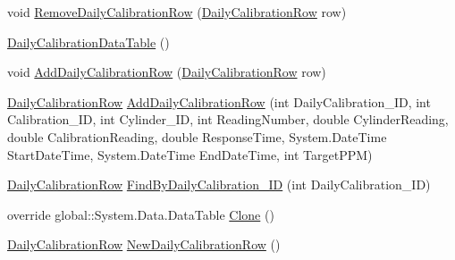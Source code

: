 \begin{DoxyCompactItemize}
\item 
void \hyperlink{class_env_int_1_1_win32_1_1_field_tech_1_1_manager_1_1_data_sets_1_1_guide_ware_mobile_data_set_5b380d875f3f569d74f6183f0c2ee8d7_a74c82b018660dfd8dadd40030c667b17}{Remove\+Daily\+Calibration\+Row} (\hyperlink{class_env_int_1_1_win32_1_1_field_tech_1_1_manager_1_1_data_sets_1_1_guide_ware_mobile_data_set_1_1_daily_calibration_row}{Daily\+Calibration\+Row} row)
\item 
\hyperlink{class_env_int_1_1_win32_1_1_field_tech_1_1_manager_1_1_data_sets_1_1_guide_ware_mobile_data_set_5b380d875f3f569d74f6183f0c2ee8d7_a2e52557c0b4cd80b98ebc66507475e6f}{Daily\+Calibration\+Data\+Table} ()
\item 
void \hyperlink{class_env_int_1_1_win32_1_1_field_tech_1_1_manager_1_1_data_sets_1_1_guide_ware_mobile_data_set_5b380d875f3f569d74f6183f0c2ee8d7_aadd6bbe6b0b0c30271faca3565c512c9}{Add\+Daily\+Calibration\+Row} (\hyperlink{class_env_int_1_1_win32_1_1_field_tech_1_1_manager_1_1_data_sets_1_1_guide_ware_mobile_data_set_1_1_daily_calibration_row}{Daily\+Calibration\+Row} row)
\item 
\hyperlink{class_env_int_1_1_win32_1_1_field_tech_1_1_manager_1_1_data_sets_1_1_guide_ware_mobile_data_set_1_1_daily_calibration_row}{Daily\+Calibration\+Row} \hyperlink{class_env_int_1_1_win32_1_1_field_tech_1_1_manager_1_1_data_sets_1_1_guide_ware_mobile_data_set_5b380d875f3f569d74f6183f0c2ee8d7_af32b7c7c15fc39cb0981c667a6bac890}{Add\+Daily\+Calibration\+Row} (int Daily\+Calibration\+\_\+\+I\+D, int Calibration\+\_\+\+I\+D, int Cylinder\+\_\+\+I\+D, int Reading\+Number, double Cylinder\+Reading, double Calibration\+Reading, double Response\+Time, System.\+Date\+Time Start\+Date\+Time, System.\+Date\+Time End\+Date\+Time, int Target\+P\+P\+M)
\item 
\hyperlink{class_env_int_1_1_win32_1_1_field_tech_1_1_manager_1_1_data_sets_1_1_guide_ware_mobile_data_set_1_1_daily_calibration_row}{Daily\+Calibration\+Row} \hyperlink{class_env_int_1_1_win32_1_1_field_tech_1_1_manager_1_1_data_sets_1_1_guide_ware_mobile_data_set_5b380d875f3f569d74f6183f0c2ee8d7_a143370f7c7b251739582a1d8cadec24a}{Find\+By\+Daily\+Calibration\+\_\+\+I\+D} (int Daily\+Calibration\+\_\+\+I\+D)
\item 
override global\+::\+System.\+Data.\+Data\+Table \hyperlink{class_env_int_1_1_win32_1_1_field_tech_1_1_manager_1_1_data_sets_1_1_guide_ware_mobile_data_set_5b380d875f3f569d74f6183f0c2ee8d7_a5ab09785530b36a0bc9f5235dfb12360}{Clone} ()
\item 
\hyperlink{class_env_int_1_1_win32_1_1_field_tech_1_1_manager_1_1_data_sets_1_1_guide_ware_mobile_data_set_1_1_daily_calibration_row}{Daily\+Calibration\+Row} \hyperlink{class_env_int_1_1_win32_1_1_field_tech_1_1_manager_1_1_data_sets_1_1_guide_ware_mobile_data_set_5b380d875f3f569d74f6183f0c2ee8d7_aa4dfb9112d73684cd64048e501d2028a}{New\+Daily\+Calibration\+Row} ()

\end{DoxyCompactItemize}
